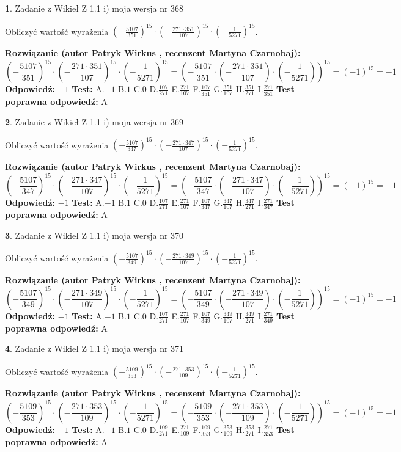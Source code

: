 \documentclass[12pt, a4paper]{article}
\theoremstyle{definition} %
\newtheorem{zad}{}
\newcommand{\zadStart}[1]{\begin{zad}#1\newline}
\newcommand{\zadStop}{\end{zad}}
\newcommand{\rozwStart}[2]{\noindent \textbf{Rozwiązanie (autor #1 , recenzent #2): }\newline}
\newcommand{\rozwStop}{\newline}
\newcommand{\odpStart}{\noindent \textbf{Odpowiedź:}\newline}
\newcommand{\odpStop}{\newline}
\newcommand{\testStart}{\noindent \textbf{Test:}\newline}
\newcommand{\testStop}{\newline}
\newcommand{\kluczStart}{\noindent \textbf{Test poprawna odpowiedź:}\newline}
\newcommand{\kluczStop}{\newline}
\begin{document}
\zadStart{Zadanie z Wikieł Z 1.1 i) moja wersja nr 368}

Obliczyć wartość wyrażenia $(-\frac{5107}{351})^{15} \cdot (-\frac{271 \cdot 351}{107})^{15} \cdot (-\frac{1}{5271})^{15}$.
\zadStop
\rozwStart{Patryk Wirkus}{Martyna Czarnobaj}
$$(-\frac{5107}{351})^{15} \cdot (-\frac{271 \cdot 351}{107})^{15} \cdot (-\frac{1}{5271})^{15} = (-\frac{5107}{351} \cdot (-\frac{271 \cdot 351}{107}) \cdot (-\frac{1}{5271}))^{15} = (-1)^{15} = -1$$
\rozwStop
\odpStart
$-1$
\odpStop
\testStart
A.$-1$ B.$1$ C.$0$ D.$\frac{107}{271}$ E.$\frac{271}{107}$
F.$\frac{107}{351}$ G.$\frac{351}{107}$
H.$\frac{351}{271}$
I.$\frac{271}{351}$
\testStop
\kluczStart
A
\kluczStop



\zadStart{Zadanie z Wikieł Z 1.1 i) moja wersja nr 369}

Obliczyć wartość wyrażenia $(-\frac{5107}{347})^{15} \cdot (-\frac{271 \cdot 347}{107})^{15} \cdot (-\frac{1}{5271})^{15}$.
\zadStop
\rozwStart{Patryk Wirkus}{Martyna Czarnobaj}
$$(-\frac{5107}{347})^{15} \cdot (-\frac{271 \cdot 347}{107})^{15} \cdot (-\frac{1}{5271})^{15} = (-\frac{5107}{347} \cdot (-\frac{271 \cdot 347}{107}) \cdot (-\frac{1}{5271}))^{15} = (-1)^{15} = -1$$
\rozwStop
\odpStart
$-1$
\odpStop
\testStart
A.$-1$ B.$1$ C.$0$ D.$\frac{107}{271}$ E.$\frac{271}{107}$
F.$\frac{107}{347}$ G.$\frac{347}{107}$
H.$\frac{347}{271}$
I.$\frac{271}{347}$
\testStop
\kluczStart
A
\kluczStop



\zadStart{Zadanie z Wikieł Z 1.1 i) moja wersja nr 370}

Obliczyć wartość wyrażenia $(-\frac{5107}{349})^{15} \cdot (-\frac{271 \cdot 349}{107})^{15} \cdot (-\frac{1}{5271})^{15}$.
\zadStop
\rozwStart{Patryk Wirkus}{Martyna Czarnobaj}
$$(-\frac{5107}{349})^{15} \cdot (-\frac{271 \cdot 349}{107})^{15} \cdot (-\frac{1}{5271})^{15} = (-\frac{5107}{349} \cdot (-\frac{271 \cdot 349}{107}) \cdot (-\frac{1}{5271}))^{15} = (-1)^{15} = -1$$
\rozwStop
\odpStart
$-1$
\odpStop
\testStart
A.$-1$ B.$1$ C.$0$ D.$\frac{107}{271}$ E.$\frac{271}{107}$
F.$\frac{107}{349}$ G.$\frac{349}{107}$
H.$\frac{349}{271}$
I.$\frac{271}{349}$
\testStop
\kluczStart
A
\kluczStop



\zadStart{Zadanie z Wikieł Z 1.1 i) moja wersja nr 371}

Obliczyć wartość wyrażenia $(-\frac{5109}{353})^{15} \cdot (-\frac{271 \cdot 353}{109})^{15} \cdot (-\frac{1}{5271})^{15}$.
\zadStop
\rozwStart{Patryk Wirkus}{Martyna Czarnobaj}
$$(-\frac{5109}{353})^{15} \cdot (-\frac{271 \cdot 353}{109})^{15} \cdot (-\frac{1}{5271})^{15} = (-\frac{5109}{353} \cdot (-\frac{271 \cdot 353}{109}) \cdot (-\frac{1}{5271}))^{15} = (-1)^{15} = -1$$
\rozwStop
\odpStart
$-1$
\odpStop
\testStart
A.$-1$ B.$1$ C.$0$ D.$\frac{109}{271}$ E.$\frac{271}{109}$
F.$\frac{109}{353}$ G.$\frac{353}{109}$
H.$\frac{353}{271}$
I.$\frac{271}{353}$
\testStop
\kluczStart
A
\kluczStop
\end{document}
